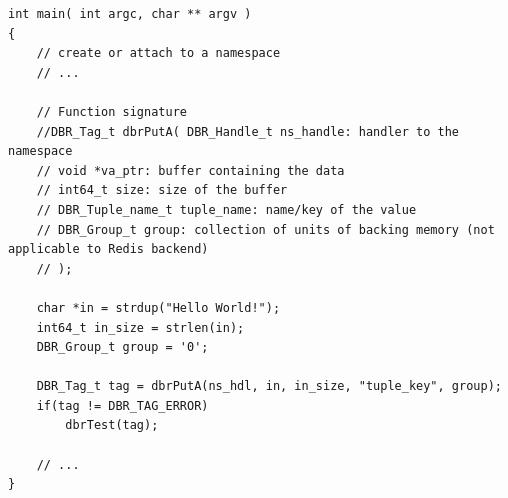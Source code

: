 \begin{lstlisting}[style=mystyle,basicstyle=\scriptsize\ttfamily,caption=Push data to the namespace (non-blocking), label=code:putA]
int main( int argc, char ** argv )
{
	// create or attach to a namespace
	// ...
	
	// Function signature
    //DBR_Tag_t dbrPutA( DBR_Handle_t ns_handle: handler to the namespace
    // void *va_ptr: buffer containing the data
    // int64_t size: size of the buffer
    // DBR_Tuple_name_t tuple_name: name/key of the value
    // DBR_Group_t group: collection of units of backing memory (not applicable to Redis backend)
    // );
    
    char *in = strdup("Hello World!");
    int64_t in_size = strlen(in);	
    DBR_Group_t group = '0';
    
    DBR_Tag_t tag = dbrPutA(ns_hdl, in, in_size, "tuple_key", group);
    if(tag != DBR_TAG_ERROR)
		dbrTest(tag);
		
	// ...
}
\end{lstlisting}

